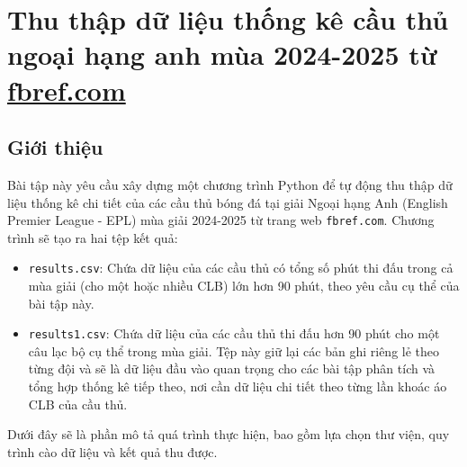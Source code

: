 \documentclass[12pt, a4paper]{report}
\begin{document}
\chapter{Thu thập dữ liệu thống kê cầu thủ ngoại hạng anh mùa 2024-2025 từ \href{http://fbref.com}{fbref.com}}
\author{} 
\date{}

\section{Giới thiệu}
Bài tập này yêu cầu xây dựng một chương trình Python để tự động thu thập dữ liệu thống kê chi tiết của các cầu thủ bóng đá tại giải Ngoại hạng Anh (English Premier League - EPL) mùa giải 2024-2025 từ trang web \texttt{fbref.com}.
Chương trình sẽ tạo ra hai tệp kết quả:
\begin{itemize}
\renewcommand{\labelitemi}{}
    \item \texttt{results.csv}: Chứa dữ liệu của các cầu thủ có tổng số phút thi đấu trong cả mùa giải (cho một hoặc nhiều CLB) lớn hơn 90 phút, theo yêu cầu cụ thể của bài tập này. 
    \item \texttt{results1.csv}: Chứa dữ liệu của các cầu thủ thi đấu hơn 90 phút cho một câu lạc bộ cụ thể trong mùa giải. Tệp này giữ lại các bản ghi riêng lẻ theo từng đội và sẽ là dữ liệu đầu vào quan trọng cho các bài tập phân tích và tổng hợp thống kê tiếp theo, nơi cần dữ liệu chi tiết theo từng lần khoác áo CLB của cầu thủ.
\end{itemize}
Dưới đây sẽ là phần mô tả quá trình thực hiện, bao gồm lựa chọn thư viện, quy trình cào dữ liệu và kết quả thu được.
\end{document}
